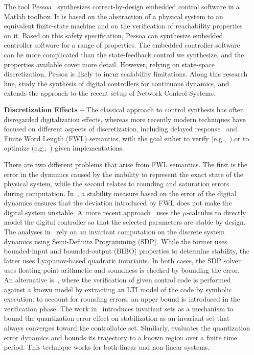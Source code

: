 \documentclass[a4paper,UKenglish]{lipics-v2018}
\begin{document}
The tool Pessoa~\cite{mazo2010pessoa} synthesizes correct-by-design embedded
control software in a Matlab toolbox.  It is based on the abstraction of a
physical system to an equivalent finite-state machine and on the
verification of reachability properties on it.  Based on this safety
specification, \mbox{Pessoa} can synthesize embedded controller software for
a range of properties.  The embedded controller software can be more
complicated than the state-feedback control we synthesize, and the
properties available cover more detail.  However, relying on state-space
discretization, \mbox{Pessoa} is likely to incur scalability limitations. 
Along this research line, \cite{Anta2010, liu16} study the synthesis of
digital controllers for continuous dynamics, and~\cite{zamani2014} extends
the approach to the recent setup of Network Control Systems.

\smallskip

\noindent\textbf{Discretization Effects --}
%
The classical approach to control synthesis has often disregarded
digitalization effects, whereas more recently modern techniques have focused
on different aspects of discretization, including delayed
response~\cite{Duggirala2015} and Finite Word Length (FWL) semantics, with
the goal either to verify (e.g.,~\cite{daes20161}) or to optimize
(e.g.,~\cite{oudjida2014design}) given implementations.

There are two different problems that arise from FWL semantics.  The first
is the error in the dynamics caused by the inability to represent the exact
state of the physical system, while the second relates to rounding and
saturation errors during computation.  In~\cite{fialho1994stability}, a
stability measure based on the error of the digital dynamics ensures that
the deviation introduced by FWL does not make the digital system unstable. 
A~more recent approach~\cite{DBLP:journals/automatica/WuLCC09} uses the
$\mu$-calculus to directly model the digital controller so that the selected
parameters are stable by design.  The analyses
in~\cite{DBLP:conf/hybrid/RouxJG15, DBLP:conf/hybrid/WangGRJF16} rely on an
invariant computation on the discrete system dynamics using Semi-Definite
Programming (SDP).  While the former uses bounded-input and bounded-output
(BIBO) properties to determine stability, the latter uses Lyapunov-based
quadratic invariants.  In both cases, the SDP solver uses floating-point
arithmetic and soundness is checked by bounding the error.  An alternative
is~\cite{park2016scalable}, where the verification of given control code is
performed against a known model by extracting an LTI model of the code by
symbolic execution: to account for rounding errors, an upper bound is
introduced in the verification phase.  The work
in~\cite{picasso2003stabilization} introduces invariant sets as a mechanism
to bound the quantization error effect on stabilization as an invariant set
that always converges toward the controllable set. 
Similarly, \cite{liberzon2003hybrid} evaluates the quantization error
dynamics and bounds its trajectory to a known region over a finite time
period.  This technique works for both linear and non-linear systems.
\end{document}
